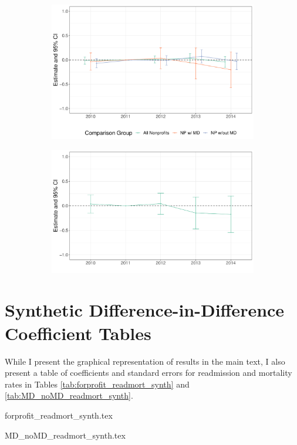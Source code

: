 \documentclass[12pt]{article}
\begin{document}
\begin{figure}[ht!]
\begin{subfigure}[b]{0.45\textwidth}
         \includegraphics[width=\textwidth]{Objects/mort_forprofit_es_graph.pdf}
         \label{fig:es_plotc}
     \end{subfigure}
     \hfill
     \begin{subfigure}[b]{0.45\textwidth}
         \centering
         \caption{}
         \includegraphics[width=\textwidth]{Objects/mort_MD_es_graph.pdf}
         \label{fig:es_plotd}
     \end{subfigure}
        \label{fig:es_plot}
    \end{figure}




\section{Synthetic Difference-in-Difference Coefficient Tables}

While I present the graphical representation of results in the main text, I also present a table of coefficients and standard errors for readmission and mortality rates in Tables \ref{tab:forprofit_readmort_synth} and \ref{tab:MD_noMD_readmort_synth}.

{forprofit_readmort_synth.tex}

{MD_noMD_readmort_synth.tex}


    

    

    

    

    

    

	
	
	
\end{document}
